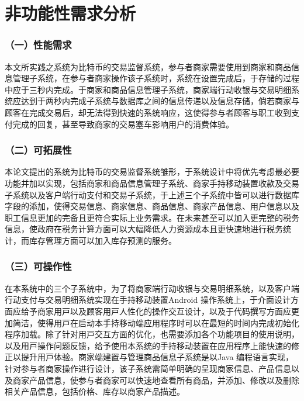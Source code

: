 	\section{非功能性需求分析}

	\subsubsection{（一）性能需求}
	
	本文所实践之系统为比特币的交易监督系统，参与者商家需要使用到商家和商品信息管理子系统，在参与者商家操作该子系统时，系统在设置完成后，于存储的过程中应于三秒内完成。于商家和商品信息管理子系统，商家端行动收银与交易明细系统应达到于两秒内完成子系统与数据库之间的信息传递以及信息存储，倘若商家与顾客在完成交易后，却无法得到快速的系统响应，这使得参与者顾客与职工收到⽀付完成的回复，甚至导致商家的交易塞车影响用户的消费体验。

	\subsubsection{（二）可拓展性}

	本论文提出的系统为比特币的交易监督系统雏形，于系统设计中将优先考虑最必要功能并加以实现，包括商家和商品信息管理子系统、商家手持移动装置收款及交易子系统以及客户端行动支付和交易子系统，于上述三个子系统中皆可以进行数据库字段的添加，使得交易信息、商家信息、商品信息、商家产品信息、用户信息以及职工信息更加的完备且更符合实际上业务需求。在未来甚⾄可以加⼊更完整的税务信息，使政府在税务计算⽅⾯可以大幅降低⼈⼒资源成本且更快速地进⾏税务统计，而库存管理⽅⾯可以加⼊库存预测的服务。

	\subsubsection{（三）可操作性}
	在本系统中的三个⼦系统中，为了将商家端⾏动收银与交易明细系统，以及客户端⾏动⽀付与交易明细系统实现在手持移动装置Android 操作系统上，于介⾯设计⽅⾯应给予商家⽤⼾以及顾客⽤⼾⼈性化的操作交互设计，以及于代码撰写⽅⾯应更加简洁，使得⽤⼾在启动本⼿持移动端应⽤程序时可以在最短的时间内完成初始化程序加载。除了针对⽤⼾交互⽅⾯的优化，也需要添加各个功能项⽬的使⽤说明，以及⽤⼾操作问题反馈，给予使用本系统的手持移动装置在应⽤程序上能快速的修正以提升⽤⼾体验。商家端建置与管理商品信息⼦系统是以Java 编程语⾔实现，针对参与者商家操作进⾏设计，该⼦系统需简单明确的呈现商家信息、产品信息以及商家产品信息，使参与者商家可以快速地查看所有商品，并添加、修改以及删除相关产品信息，包括价格、库存以商家产品描述。


